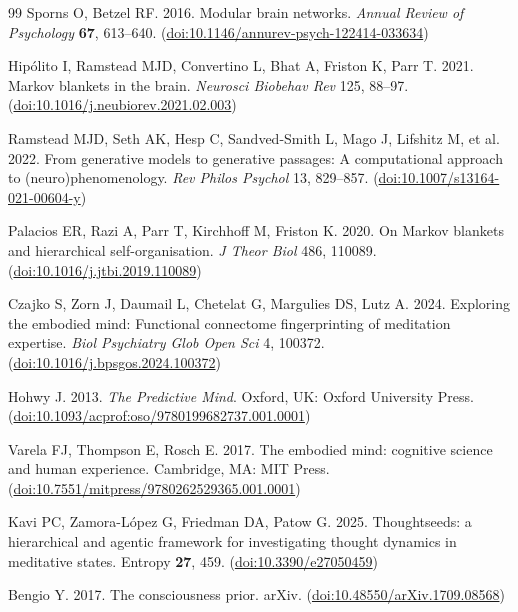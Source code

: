 \documentclass[openacc]{rsproca_new}%
\begin{document}
\begin{thebibliography}{99}
Sporns O, Betzel RF. 2016. Modular brain networks. \textit{Annual Review of Psychology} \textbf{67}, 613--640. (\href{https://doi.org/10.1146/annurev-psych-122414-033634}{doi:10.1146/annurev-psych-122414-033634})

Hipólito I, Ramstead MJD, Convertino L, Bhat A, Friston K, Parr T. 2021. Markov blankets in the brain. \textit{Neurosci Biobehav Rev} 125, 88--97. (\href{https://doi.org/10.1016/j.neubiorev.2021.02.003}{doi:10.1016/j.neubiorev.2021.02.003})

Ramstead MJD, Seth AK, Hesp C, Sandved-Smith L, Mago J, Lifshitz M, et al. 2022. From generative models to generative passages: A computational approach to (neuro)phenomenology. \textit{Rev Philos Psychol} 13, 829--857. (\href{https://doi.org/10.1007/s13164-021-00604-y}{doi:10.1007/s13164-021-00604-y})

Palacios ER, Razi A, Parr T, Kirchhoff M, Friston K. 2020. On Markov blankets and hierarchical self-organisation. \textit{J Theor Biol} 486, 110089. (\href{https://doi.org/10.1016/j.jtbi.2019.110089}{doi:10.1016/j.jtbi.2019.110089})

Czajko S, Zorn J, Daumail L, Chetelat G, Margulies DS, Lutz A. 2024. Exploring the embodied mind: Functional connectome fingerprinting of meditation expertise. \textit{Biol Psychiatry Glob Open Sci} 4, 100372. (\href{https://doi.org/10.1016/j.bpsgos.2024.100372}{doi:10.1016/j.bpsgos.2024.100372})

Hohwy J. 2013. \textit{The Predictive Mind}. Oxford, UK: Oxford University Press. (\href{https://doi.org/10.1093/acprof:oso/9780199682737.001.0001}{doi:10.1093/acprof:oso/9780199682737.001.0001})

Varela FJ, Thompson E, Rosch E. 2017. The embodied mind: cognitive science and human experience. Cambridge, MA: MIT Press. (\href{https://doi.org/10.7551/mitpress/9780262529365.001.0001}{doi:10.7551/mitpress/9780262529365.001.0001})

Kavi PC, Zamora-L\'opez G, Friedman DA, Patow G. 2025. Thoughtseeds: a hierarchical and agentic framework for investigating thought dynamics in meditative states. Entropy \textbf{27}, 459. (\href{https://doi.org/10.3390/e27050459}{doi:10.3390/e27050459})

Bengio Y. 2017. The consciousness prior. arXiv. (\href{https://doi.org/10.48550/arXiv.1709.08568}{doi:10.48550/arXiv.1709.08568})


\end{thebibliography}
\end{document}

